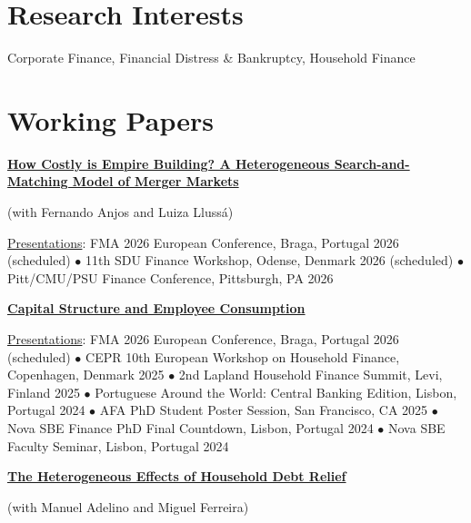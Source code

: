 \documentclass[letterpaper]{article}
\newenvironment{itemize*}{
  \begin{list}{}{
    \setlength{\leftmargin}{1.5em}
  }
}{
  \end{list}
}
\begin{document}
\section*{Research Interests}
\vspace{-0.2in}
\hrulefill
\begin{itemize*}
\item Corporate Finance, Financial Distress \& Bankruptcy, Household Finance
\end{itemize*}

\section*{Working Papers}
\vspace{-0.2in}
\hrulefill

\begin{itemize*}
\item \href{https://miguelcfoliveira.github.io/Papers/empire_building.pdf}{\color{blue}\textbf{How Costly is Empire Building? A Heterogeneous Search-and-Matching Model of Merger Markets}}

	(with Fernando Anjos and Luiza Llussá)
	
	\underline{Presentations}: FMA 2026 European Conference, Braga, Portugal 2026 (scheduled) $\bullet$ 11th SDU Finance Workshop, Odense, Denmark 2026 (scheduled) $\bullet$ Pitt/CMU/PSU Finance Conference, Pittsburgh, PA 2026
\medskip

\item \href{https://miguelcfoliveira.github.io/Papers/Homemade_Unleverage.pdf}{\color{blue}\textbf{Capital Structure and Employee Consumption}}

\underline{Presentations}: FMA 2026 European Conference, Braga, Portugal 2026 (scheduled) $\bullet$ CEPR 10th European Workshop on Household Finance, Copenhagen, Denmark 2025 $\bullet$ 2nd Lapland Household Finance Summit, Levi, Finland 2025 $\bullet$ Portuguese Around the World: Central Banking Edition, Lisbon, Portugal 2024 $\bullet$ AFA PhD Student Poster Session, San Francisco, CA 2025 $\bullet$ Nova SBE Finance PhD Final Countdown, Lisbon, Portugal 2024 $\bullet$ Nova SBE Faculty Seminar, Lisbon, Portugal 2024
\medskip

\item \href{https://papers.ssrn.com/sol3/papers.cfm?abstract_id=4784540}{\color{blue}\textbf{The Heterogeneous Effects of Household Debt Relief}}

	(with Manuel Adelino and Miguel Ferreira)
	

\end{itemize*}
\end{document}
